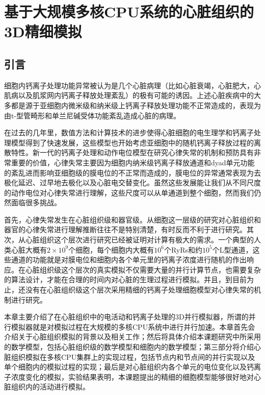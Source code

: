 \chapter{基于大规模多核CPU系统的心脏组织的3D精细模拟}
\label{ICA3PP}

\section{引言}
细胞内钙离子处理功能异常被认为是几个心脏病理（比如心脏衰竭，心脏肥大，心肌病以及肌浆网内钙离子释放处理紊乱）的极有可能的诱因。上述心脏疾病中的大多都是源于亚细胞内微米级和纳米级上钙离子释放处理功能不正常造成的，表现为由t-型管畸形和单兰尼碱受体功能紊乱造成心脏的病理。

在过去的几年里，数值方法和计算技术的进步使得心脏细胞的电生理学和钙离子处理模型得到了快速发展，这些模型也开始考虑亚细胞中的随机钙离子释放过程的离散特性。新一代的钙离子处理和动作电位模型在研究心律失常的机制和预防具有非常重要的价值，心律失常主要因为细胞内纳米级钙离子释放通道和dyad单元功能的紊乱进而影响亚细胞级的膜电位的不正常而造成的，膜电位的异常通常表现为去极化延迟、过早地去极化以及心脏电交替变化。虽然这些发展能让我们从不同尺度的动作电位对心律失常进行理解，这些尺度可以从单通道到整个细胞，然而我们仍然面临很多挑战。

首先，心律失常发生在心脏组织级和器官级。从细胞这一层级的研究对心脏组织和器官的心律失常进行理解推断往往不是特别清楚，有时反而不利于进行研究。其次，从心脏组织这个层次进行研究已经被证明对计算有极大的需求。一个典型的人类心脏大概有$2 \times 10^9 $个细胞，每个细胞内大概有$10^6$个RyRs和约$10^5$个L型通道，这些通道的功能就是对膜电位和细胞内各个单元里的钙离子浓度进行随机的作出响应。在心脏组织级这个层次的真实模拟不仅需要大量的并行计算节点，也需要复杂的算法设计，才能在合理的时间内对心脏的生理过程进行模拟。并且，到目前为止，还没有在心脏组织级这个层次采用精细的钙离子处理细胞模型对心律失常的机制进行研究。

本章主要介绍了在心脏组织中的电活动和钙离子处理的3D并行模拟器，所谓的并行模拟器就是对模拟过程在大规模的多核CPU系统中进行并行加速。本章首先会介绍关于心脏组织模拟的背景以及相关工作；然后将具体介绍本课题研究中所采用的数学模型，包括心脏组织级的数学模型和细胞内的数学模型；第三部分将介绍心脏组织模拟在多核CPU集群上的实现过程，包括节点内和节点间的并行实现以及单个细胞内的模拟过程的实现；最后是对心脏组织内各个单元的电位变化以及钙离子浓度变化的模拟，实验结果表明，本课题提出的精细的细胞模型能够很好地对心脏组织内的活动进行模拟。

